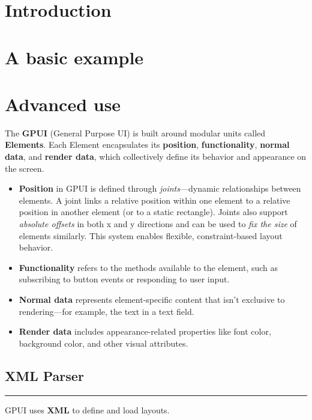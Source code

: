 \documentclass[a4paper,11pt]{article}
\begin{document}
\section*{Introduction}
\section*{A basic example}




\newpage
\section*{Advanced use}
The \textbf{GPUI} (General Purpose UI) is built around modular units called \textbf{Elements}.  
Each Element encapsulates its \textbf{position}, \textbf{functionality}, \textbf{normal data}, and \textbf{render data}, which collectively define its behavior and appearance on the screen.

\begin{itemize}
    \item \textbf{Position} in GPUI is defined through \textit{joints}—dynamic relationships between elements. A joint links a relative position within one element to a relative position in another element (or to a static rectangle). Joints also support \textit{absolute offsets} in both x and y directions and can be used to \textit{fix the size} of elements similarly. This system enables flexible, constraint-based layout behavior.

    \item \textbf{Functionality} refers to the methods available to the element, such as subscribing to button events or responding to user input.

    \item \textbf{Normal data} represents element-specific content that isn’t exclusive to rendering—for example, the text in a text field.

    \item \textbf{Render data} includes appearance-related properties like font color, background color, and other visual attributes.
\end{itemize}

\subsection*{XML Parser}
\vspace{-1.2em}
\rule{\linewidth}{0.4pt}
GPUI uses \textbf{XML} to define and load layouts.
\end{document}
